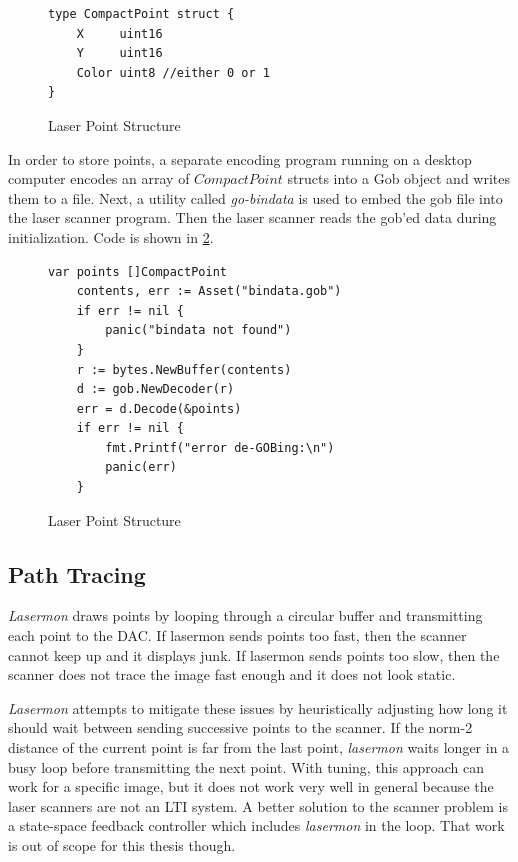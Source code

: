 \begin{figure}[!h]
\begin{center}
\begin{lstlisting}
type CompactPoint struct {
	X     uint16
	Y     uint16
	Color uint8 //either 0 or 1
}
\end{lstlisting}
\end{center}
  \caption{Laser Point Structure} \label{fig:cpoint}
\end{figure}

In order to store points, a separate encoding program running
on a desktop computer encodes an array of $CompactPoint$ structs into
a Gob object and writes them to a file. Next, a utility called
\textit{go-bindata} \cite{gobin} is used to embed the gob file into the laser scanner
program. Then the laser scanner reads the gob'ed data during initialization.
Code is shown in \ref{fig:loadpoints}.

\begin{figure}[h]
\begin{center}
\begin{lstlisting}
var points []CompactPoint
	contents, err := Asset("bindata.gob")
	if err != nil {
		panic("bindata not found")
	}
	r := bytes.NewBuffer(contents)
	d := gob.NewDecoder(r)
	err = d.Decode(&points)
	if err != nil {
		fmt.Printf("error de-GOBing:\n")
		panic(err)
	}
\end{lstlisting}
\end{center}
  \caption{Laser Point Structure} \label{fig:loadpoints}
\end{figure}

\subsection{Path Tracing}
\textit{Lasermon} draws points by looping through a circular buffer and transmitting each point to
the DAC. If lasermon sends points too fast, then the scanner cannot keep up and it displays junk. If
lasermon sends points too slow, then the scanner does not trace the image fast enough and it does not
look static.

\textit{Lasermon} attempts to mitigate these issues by heuristically adjusting how long it should wait between
sending successive points to the scanner. If the norm-2 distance of the current point is far from the last
point, \textit{lasermon} waits longer in a busy loop before transmitting the next point. With tuning, this approach can
work for a specific image, but it does not
work very well in general because the laser scanners are not an LTI system. A better solution to the scanner problem
is a state-space feedback controller which includes \textit{lasermon} in the loop. That work is out of scope for
this thesis though.

